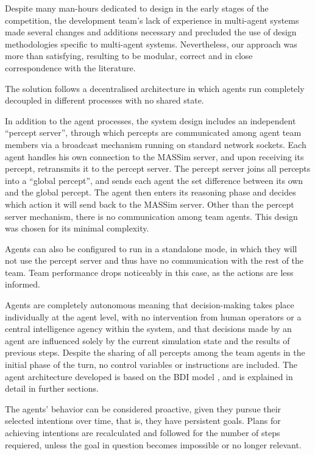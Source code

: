 \documentclass{llncs2e/llncs}
\begin{document}
    Despite many man-hours dedicated to design in the early stages of the
    competition, the development team's lack of experience in multi-agent
    systems made several changes and additions necessary and precluded the use
    of design methodologies specific to multi-agent systems.  Nevertheless, our
    approach was more than satisfying, resulting to be modular, correct and in
    close correspondence with the literature.

    The solution follows a decentralised architecture in which agents run
    completely decoupled in different processes with no shared state. 
    
    In addition to the agent processes, the system design includes an
    independent ``percept server'', through which percepts are communicated
    among agent team members via a broadcast mechanism running on standard
    network sockets.  Each agent handles his own connection to the MASSim
    server, and upon receiving its percept, retransmits it to the percept
    server.  The percept server joins all percepts into a ``global percept'',
    and sends each agent the set difference between its own and the global
    percept.  The agent then enters its reasoning phase and decides which
    action it will send back to the MASSim server.  Other than the percept
    server mechanism, there is no communication among team agents. This design
    was chosen for its minimal complexity.

    Agents can also be configured to run in a standalone mode, in which they will
    not use the percept server and thus have no communication with the rest of
    the team.  Team performance drops noticeably in this case, as the actions
    are less informed. 

    Agents are completely autonomous meaning that decision-making takes place
    individually at the agent level, with no intervention from human operators
    or a central intelligence agency within the system, and that decisions made
    by an agent are influenced solely by the current simulation state and the
    results of previous steps.  
    Despite the sharing of all percepts among the team agents in the initial
    phase of the turn, no control variables or instructions are included. 
    The agent architecture developed is based on the
    BDI model \cite{Rao:1991}, and is explained in detail in further sections.

    The agents' behavior can be considered proactive, given they pursue their 
    selected intentions over time, that is, they have persistent goals. Plans 
    for achieving intentions are recalculated and followed for the number of
    steps requiered, unless the goal in question becomes impossible or no longer
    relevant.
\end{document}
